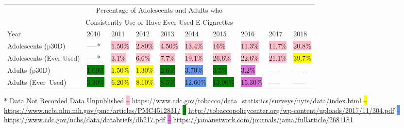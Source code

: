 \begin{center}
    \begin{tabular}{p{1in} p{0.45in} p{0.45in} p{0.45in} p{0.45in} p{0.45in} p{0.45in} p{0.45in} p{0.45in} p{0.45in}}
        \toprule
        \multicolumn{10}{c}{Percentage of Adolescents and Adults who}\\
        \multicolumn{10}{c}{Consistently Use or Have Ever Used E-Cigarettes}\\    
        \midrule
        Year & 2010 & 2011 & 2012 & 2013 & 2014 & 2015 & 2016 & 2017 & 2018 \\
        \midrule
        Adolescents (p30D) & -----* & \colorbox{pink}{1.50\%} & \colorbox{pink}{2.80\%} & \colorbox{pink}{4.50\%} & \colorbox{pink}{13.4\%} & \colorbox{pink}{16\%} & \colorbox{pink}{11.3\%} & \colorbox{pink}{11.7\%} & \colorbox{pink}{20.8\%} \\
        Adolescents (Ever Used) & -----* & \colorbox{pink}{3.1\%} & \colorbox{pink}{6.6\%} & \colorbox{pink}{7.7\%} & \colorbox{pink}{19.1\%} & \colorbox{pink}{26.6\%}  & \colorbox{pink}{22.6\%} & \colorbox{pink}{21.1\%} & \colorbox{yellow}{39.7\%} \\
        Adults (p30D) & \colorbox{green}{1.00\%} & \colorbox{yellow}{1.50\%} & \colorbox{yellow}{1.30\%} & \colorbox{green}{2.6\%} & \colorbox{CornflowerBlue}{3.70\%} & \colorbox{green}{3.5\%} & \colorbox{Orchid}{3.2\%} & -----\textdagger{} & -----\textdagger{} \\
        Adults (Ever~Used) & \colorbox{green}{3.30\%} & \colorbox{yellow}{6.20\%} & \colorbox{yellow}{8.10\%} & \colorbox{green}{8.5\%} & \colorbox{CornflowerBlue}{12.60\%} & \colorbox{green}{13.90\%}  & \colorbox{Orchid}{15.30\%} & -----\textdagger{} & -----\textdagger{} \\
        \bottomrule
    \end{tabular}
\end{center}
%
* Data Not Recorded
\newline
\textdagger{} Data Unpublished
\newline
\colorbox{pink}{--} \url{https://www.cdc.gov/tobacco/data_statistics/surveys/nyts/data/index.html}
\newline
\colorbox{yellow}{--} \url{https://www.ncbi.nlm.nih.gov/pmc/articles/PMC4512831/}
\newline
\colorbox{green}{--} \url{http://tobaccopolicycenter.org/wp-content/uploads/2017/11/304.pdf}
\newline
\colorbox{CornflowerBlue}{--} \url{https://www.cdc.gov/nchs/data/databriefs/db217.pdf}
\newline
\colorbox{Orchid}{--} \url{https://jamanetwork.com/journals/jama/fullarticle/2681181}

